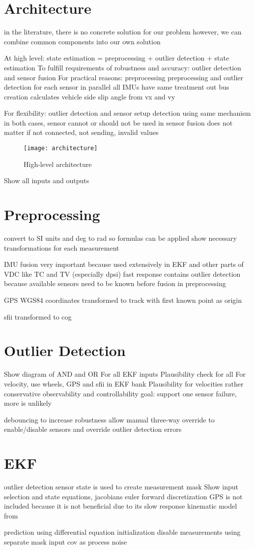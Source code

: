 \section{Architecture}
in the literature, there is no concrete solution for our problem
however, we can combine common components into our own solution

At high level: state estimation = preprocessing + outlier detection + state estimation
To fulfill requirements of robustness and accuracy: outlier detection and sensor fusion
For practical reasons: preprocessing
preprocessing and outlier detection for each sensor in parallel
all IMUs have same treatment
out bus creation calculates vehicle side slip angle from vx and vy

For flexibility: outlier detection and sensor setup detection using same mechanism
in both cases, sensor cannot or should not be used in sensor fusion
does not matter if not connected, not sending, invalid values

\begin{figure}[h]
	\centering
	\texttt{[image: architecture]}%
	\caption{High-level architecture}
	\label{fig:architecture}
\end{figure}
Show all inputs and outputs

\section{Preprocessing}
convert to SI units and deg to rad so formulas can be applied
show necessary transformations for each measurement

IMU fusion
very important because used extensively in EKF and other parts of VDC like TC and TV (especially dpsi)
fast response
contains outlier detection because available sensors need to be known before fusion in preprocessing

GPS WGS84 coordinates transformed to track with first known point as origin

sfii transformed to \gls{cog}

\section{Outlier Detection}
Show diagram of AND and OR
For all EKF inputs
Plausibility check for all
For velocity, use wheels, GPS and sfii in EKF bank
Plausibility for velocities rather conservative
observability and controllability
goal: support one sensor failure, more is unlikely

debouncing to increase robustness
allow manual three-way override to enable/disable sensors and override outlier detection errors

\section{EKF}
outlier detection sensor state is used to create measurement mask
Show input selection and state equations, jacobians
euler forward discretization
GPS is not included because it is not beneficial due to its slow response
kinematic model from~\cite[p.~156]{AlexanderWischnewski.2019}


prediction using differential equation
initialization
disable measurements using separate mask
input cov as process noise
